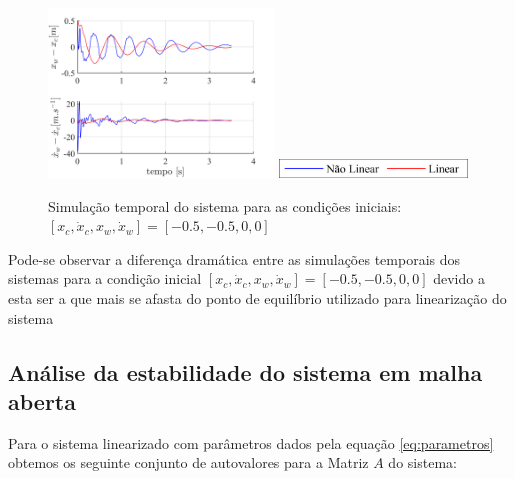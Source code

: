 \documentclass[a4paper]{ifacconf}
\begin{document}
    \FloatBarrier
    \begin{figure}[htbp]
        \begin{centering}
            \includegraphics[width=6cm]{img/sim_temp_xc_n05_dxc_n05.png}
            \includegraphics[width=5cm]{img/sim_temp_Leg.png}
            \caption{Simulação temporal do sistema para as condições iniciais:  $[x_c, \dot{x}_c, x_w, \dot{x}_w]=[-0.5,-0.5,0,0]$}
            \label{fig:sim_temp_xc_n01_dxc_n01}
        \end{centering}
    \end{figure}
    \FloatBarrier
    
    Pode-se observar a diferença dramática entre as simulações temporais dos sistemas para a condição inicial $[x_c, \dot{x}_c, x_w, \dot{x}_w]=[-0.5,-0.5,0,0]$ devido a esta ser a que mais se afasta do ponto de equilíbrio utilizado para linearização do sistema
    
    \subsection{Análise da estabilidade do sistema em malha aberta}
    
    Para o sistema linearizado com parâmetros dados pela equação \ref{eq:parametros} obtemos os seguinte conjunto de autovalores para a Matriz $A$ do sistema:
    
\end{document}
